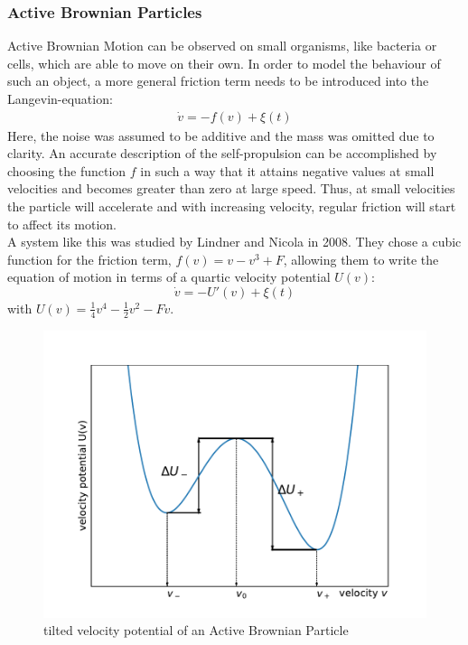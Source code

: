 \documentclass[12pt,a4paper]{article}
\begin{document}
\subsubsection{Active Brownian Particles}
Active Brownian Motion can be observed on small organisms, like bacteria or cells, which are able to move on their own. In order to model the behaviour of such an object, a more general friction term needs to be introduced into the Langevin-equation:
\begin{align*}
\dot{v}=-f(v)+\xi(t)
\end{align*}
Here, the noise was assumed to be additive and the mass was omitted due to clarity.
An accurate description of the self-propulsion can be accomplished by choosing the function $f$ in such a way that it attains negative values at small velocities and becomes greater than zero at large speed. Thus, at small velocities the particle will accelerate and with increasing velocity, regular friction will start to affect its motion.
\\
A system like this was studied by Lindner and Nicola in 2008\cite{abp}. They chose a cubic function for the friction term, $f(v)=v-v^3+F$, allowing them to write the equation of motion in terms of a quartic velocity potential $U(v)$:
\begin{equation}
\dot{v}=-U'(v)+\xi(t)
\end{equation}
with $U(v)=\frac{1}{4}v^4-\frac{1}{2}v^2-Fv$.
\begin{figure}[H]
	\centering
	\includegraphics[scale=1]{velpot.pdf} 
	\caption{tilted velocity potential of an Active Brownian Particle}
	\label{velpot}
\end{figure}
\end{document}
